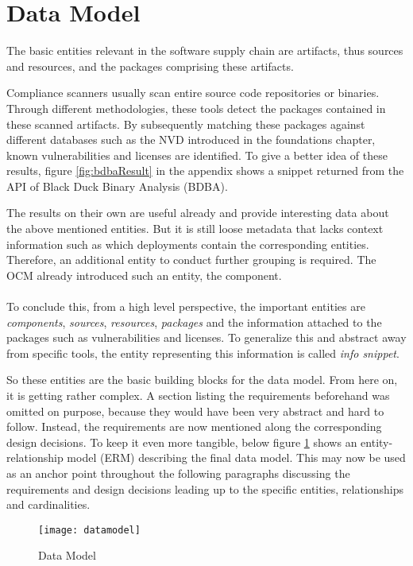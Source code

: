 \section{Data Model}
The basic entities relevant in the software supply chain are artifacts, thus sources and resources, and the packages comprising these artifacts.\par
Compliance scanners usually scan entire source code repositories or binaries. Through different methodologies, these tools detect the packages contained in these scanned artifacts. By subsequently matching these packages against different databases such as the NVD introduced in the foundations chapter, known vulnerabilities and licenses are identified. To give a better idea of these results, figure \ref{fig:bdbaResult} in the appendix shows a snippet returned from the API of Black Duck Binary Analysis (BDBA).\par 
The results on their own are useful already and provide interesting data about the above mentioned entities. But it is still loose metadata that lacks context information such as which deployments contain the corresponding entities. Therefore, an additional entity to conduct further grouping is required. The OCM already introduced such an entity, the component.\\\\
To conclude this, from a high level perspective, the important entities are \emph{components}, \emph{sources}, \emph{resources}, \emph{packages} and the information attached to the packages such as vulnerabilities and licenses. To generalize this and abstract away from specific tools, the entity representing this information is called \emph{info snippet}.\par 
So these entities are the basic building blocks for the data model. From here on, it is getting rather complex. A section listing the requirements beforehand was omitted on purpose, because they would have been very abstract and hard to follow. Instead, the requirements are now mentioned along the corresponding design decisions. To keep it even more tangible, below figure \ref{fig:DataModel} shows an entity-relationship model (ERM) describing the final data model. This may now be used as an anchor point throughout the following paragraphs discussing the requirements and design decisions leading up to the specific entities, relationships and cardinalities.

\begin{figure}[H]
	\centering
	\texttt{[image: datamodel]}
	\caption[Data Model]{Data Model }
	\label{fig:DataModel}
\end{figure} 




